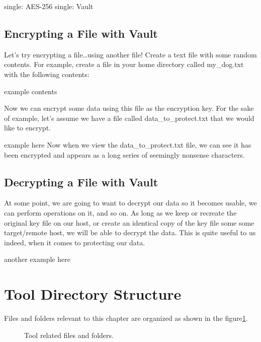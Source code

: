 single: AES-256 single: Vault

\subsection{Encrypting a File with Vault}

\justifying
Let's try encrypting a file\ldots using another file! Create a text file
with some random contents. For example, create a file in your home
directory called my\_dog.txt with the following contents:

example contents

\justifying
Now we can encrypt some data using this file as the encryption key. For
the sake of example, let's assume we have a file called
data\_to\_protect.txt that we would like to encrypt.

example here
\justifying
Now when we view the data\_to\_protect.txt file, we can see it has been
encrypted and appears as a long series of seemingly nonsense characters.

\subsection{Decrypting a File with Vault}
\justifying
At some point, we are going to want to decrypt our data so it becomes
usable, we can perform operations on it, and so on. As long as we keep
or recreate the original key file on our host, or create an identical
copy of the key file some some target/remote host, we will be able to
decrypt the data. This is quite useful to us indeed, when it comes to
protecting our data.

another example here

\clearpage

\section{Tool Directory Structure}
\justifying
Files and folders relevant to this chapter are organized as shown in
the figure\ref{toolsfiles}.

\begin{figure}[!htb]
	
	\caption{Tool related files and folders.}
\label{toolsfiles}
\end{figure}
